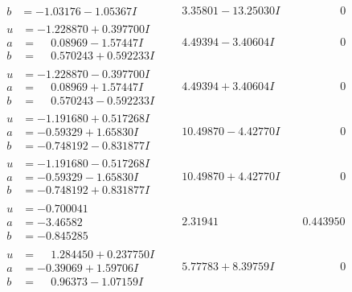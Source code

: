 \documentclass[1p]{elsarticle_modified}
\theoremstyle{definition}
\begin{document}
$$\begin{array}{c|c|c}
\begin{aligned}
b &= -1.03176 - 1.05367 I\end{aligned}
 & \phantom{-}3.35801 - 13.25030 I & \phantom{-0.000000 } 0 \\ \hline\begin{aligned}
u &= -1.228870 + 0.397700 I \\
a &= \phantom{-}0.08969 - 1.57447 I \\
b &= \phantom{-}0.570243 + 0.592233 I\end{aligned}
 & \phantom{-}4.49394 - 3.40604 I & \phantom{-0.000000 } 0 \\ \hline\begin{aligned}
u &= -1.228870 - 0.397700 I \\
a &= \phantom{-}0.08969 + 1.57447 I \\
b &= \phantom{-}0.570243 - 0.592233 I\end{aligned}
 & \phantom{-}4.49394 + 3.40604 I & \phantom{-0.000000 } 0 \\ \hline\begin{aligned}
u &= -1.191680 + 0.517268 I \\
a &= -0.59329 + 1.65830 I \\
b &= -0.748192 - 0.831877 I\end{aligned}
 & \phantom{-}10.49870 - 4.42770 I & \phantom{-0.000000 } 0 \\ \hline\begin{aligned}
u &= -1.191680 - 0.517268 I \\
a &= -0.59329 - 1.65830 I \\
b &= -0.748192 + 0.831877 I\end{aligned}
 & \phantom{-}10.49870 + 4.42770 I & \phantom{-0.000000 } 0 \\ \hline\begin{aligned}
u &= -0.700041\phantom{ +0.000000I} \\
a &= -3.46582\phantom{ +0.000000I} \\
b &= -0.845285\phantom{ +0.000000I}\end{aligned}
 & \phantom{-}2.31941\phantom{ +0.000000I} & \phantom{-}0.443950\phantom{ +0.000000I} \\ \hline\begin{aligned}
u &= \phantom{-}1.284450 + 0.237750 I \\
a &= -0.39069 + 1.59706 I \\
b &= \phantom{-}0.96373 - 1.07159 I\end{aligned}
 & \phantom{-}5.77783 + 8.39759 I & \phantom{-0.000000 } 0 \\ \hline\begin{aligned}

\end{aligned}
\end{array}$$
\end{document}
